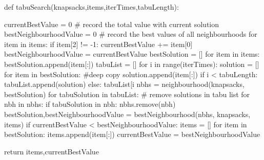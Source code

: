 def tabuSearch(knapsacks,items,iterTimes,tabuLength):
    
    currentBestValue = 0 
    # record the total value with current solution
    bestNeighbourhoodValue = 0 
    # record the best values of all neighbourhoods
    for item in items:
        if item[2] != -1:
            currentBestValue += item[0]
    bestNeighbourhoodValue = currentBestValue
    bestSolution = []
    for item in items:
        bestSolution.append(item[:])
    tabuList = []
    for i in range(iterTimes):
        solution = []
        for item in bestSolution: 
            #deep copy
            solution.append(item[:])
        if i < tabuLength:
            tabuList.append(solution)
        else:
            tabuList[i %
        nbhs = neighbourhood(knapsacks, bestSolution)
        for tabuSolution in tabuList: 
            # remove solutions in tabu list 
            for nbh in nbhs:
                if tabuSolution in nbh:
                    nbhs.remove(nbh)
        bestSolution,bestNeighbourhoodValue = bestNeighbourhood(nbhs, knapsacks, items)
        if currentBestValue < bestNeighbourhoodValue:
            items = []
            for item in bestSolution:
                items.append(item[:])
            currentBestValue = bestNeighbourhoodValue
        
    return items,currentBestValue